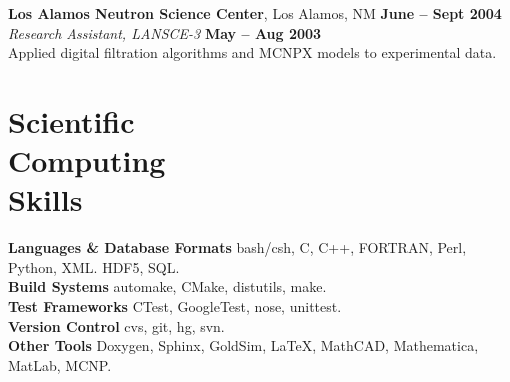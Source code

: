 \documentclass[margin,line]{resume}
\begin{document}
\begin{resume}
    \textbf{Los Alamos Neutron Science Center}, Los Alamos, NM \hfill \textbf{June -- Sept 2004}\\ 
                \textsl{Research Assistant, LANSCE-3} \hfill \textbf{May -- Aug 2003}\\
                Applied digital filtration algorithms and MCNPX models to experimental data.  \vspace{-3mm}
    \section{\mysidestyle Scientific\\Computing\\Skills} 
                \textbf{Languages \& Database Formats} \hfill bash/csh, C, C++, FORTRAN, Perl, Python, XML. HDF5, SQL.\vspace{.5mm}\\%
                \textbf{Build Systems} \hfill automake, CMake, distutils, make.\vspace{.5mm}\\%
                \textbf{Test Frameworks} \hfill CTest, GoogleTest, nose, unittest.\vspace{.5mm}\\%
                \textbf{Version Control} \hfill cvs, git, hg, svn.\vspace{.5mm}\\%
                \textbf{Other Tools} \hfill Doxygen, Sphinx, GoldSim, \LaTeX, MathCAD, Mathematica, MatLab, MCNP.\vspace{.5mm}%

    \vspace{-3mm}

\end{resume}
\end{document}
